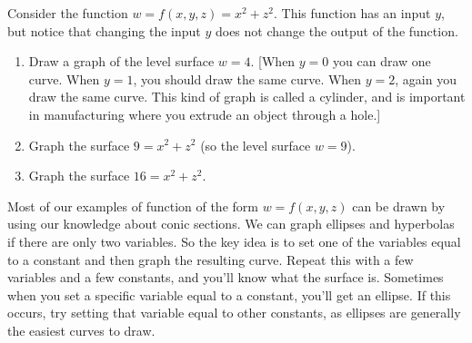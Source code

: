 \begin{problem}
%
Consider the function $w=f(x,y,z)=x^2+z^2$. This function has an input $y$, but notice that changing the input $y$ does not change the output of the function.
 \begin{enumerate}
  \item Draw a graph of the level surface $w=4$. [When $y=0$ you can draw one curve.  When $y=1$, you should draw the same curve.  When $y=2$, again you draw the same curve.  This kind of graph is called a cylinder, and is important in manufacturing where you extrude an object through a hole.]
  \item Graph the surface $9=x^2+z^2$ (so the level surface $w=9$).
  \item Graph the surface $16=x^2+z^2$.
 \end{enumerate}
\end{problem}

Most of our examples of function of the form $w=f(x,y,z)$ can be drawn by using our knowledge about conic sections. We can graph ellipses and hyperbolas if there are only two variables. So the key idea is to set one of the variables equal to a constant and then graph the resulting curve.  Repeat this with a few variables and a few constants, and you'll know what the surface is. Sometimes when you set a specific variable equal to a constant, you'll get an ellipse. If this occurs, try setting that variable equal to other constants, as ellipses are generally the easiest curves to draw.

